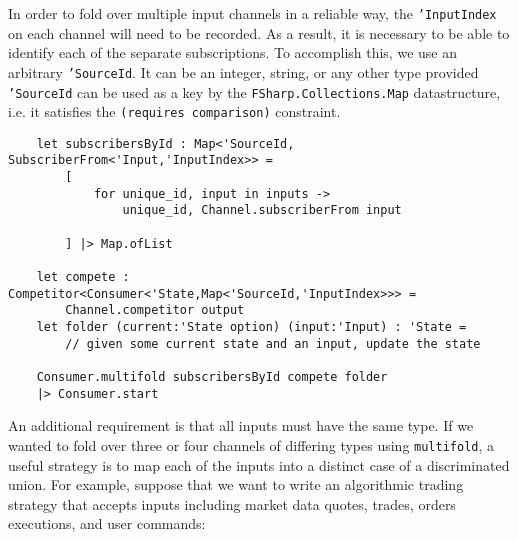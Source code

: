 \documentclass{article}
\begin{document}
In order to fold over multiple input channels in a reliable way, the \texttt{'InputIndex} on each channel will need to be recorded.  As a result, it is necessary to be able to identify each of the separate subscriptions.  To accomplish this, we use an arbitrary \texttt{'SourceId}.  It can be an integer, string, or any other type provided \texttt{'SourceId} can be used as a key by the \texttt{FSharp.Collections.Map} datastructure, i.e. it satisfies the  \texttt{(requires comparison)} constraint.

\begin{verbatim}
    let subscribersById : Map<'SourceId, SubscriberFrom<'Input,'InputIndex>> =
        [
            for unique_id, input in inputs ->
                unique_id, Channel.subscriberFrom input

        ] |> Map.ofList

    let compete : Competitor<Consumer<'State,Map<'SourceId,'InputIndex>>> =
        Channel.competitor output
    let folder (current:'State option) (input:'Input) : 'State =
        // given some current state and an input, update the state

    Consumer.multifold subscribersById compete folder
    |> Consumer.start
\end{verbatim}

An additional requirement is that all inputs must have the same type.  If we wanted to fold over three or four channels of differing types using \texttt{multifold}, a useful strategy is to map each of the inputs into a distinct case of a discriminated union.  For example, suppose that we want to write an algorithmic trading strategy that accepts inputs including market data quotes, trades, orders executions, and user commands:
\end{document}
